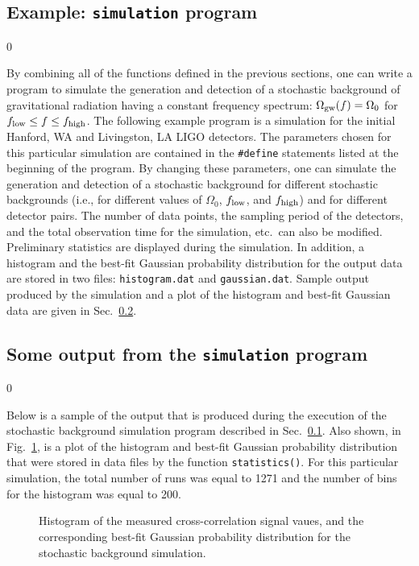 \subsection{Example: {\tt simulation} program}
\label{subsec:example_simulation}
\setcounter{equation}0

By combining all of the functions defined in the previous sections,
one can write a program to simulate the generation and detection of a 
stochastic background of gravitational radiation having a constant 
frequency spectrum:
$\Omega_{\rm gw}(f)=\Omega_0$ for $f_{\rm low}\le f\le f_{\rm high}$.
The following example program is a simulation for the initial 
Hanford, WA and Livingston, LA LIGO detectors.
The parameters chosen for this particular simulation are contained in 
the {\tt \#define} statements listed at the beginning of the program.
By changing these parameters, one can simulate the generation
and detection of a stochastic background for different stochastic
backgrounds (i.e., for different values of $\Omega_0$, $f_{\rm low}$,
and $f_{\rm high}$) and for different detector pairs.
The number of data points, the sampling period of the detectors, and
the total observation time for the simulation, etc.~can also be modified.
Preliminary statistics are displayed during the simulation.
In addition, a histogram and the best-fit Gaussian probability 
distribution for the output data are stored in two files:
{\tt histogram.dat} and {\tt gaussian.dat}.
Sample output produced by the simulation and a plot of the histogram 
and best-fit Gaussian data are given in 
Sec.~\ref{subsec:example_sample_output}.


\clearpage

\subsection{Some output from the {\tt simulation} program}
\label{subsec:example_sample_output}
\setcounter{equation}0

Below is a sample of the output that is produced during the execution
of the stochastic background simulation program described in
Sec.~\ref{subsec:example_simulation}.
Also shown, in Fig.~\ref{f:f5}, is a plot of the histogram and 
best-fit Gaussian probability distribution that were stored in data files
by the function {\tt statistics()}.
For this particular simulation, the total number of runs was equal to
1271 and the number of bins for the histogram was equal to 200.


\begin{figure}[h]
\begin{center}
{}
\caption{\label{f:f5} 
Histogram of the measured cross-correlation signal vaues, and the
corresponding best-fit Gaussian probability distribution for the 
stochastic background simulation.}
\end{center}
\end{figure}
\clearpage


